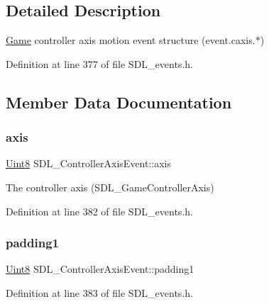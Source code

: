 \subsection{Detailed Description}
\mbox{\hyperlink{class_game}{Game}} controller axis motion event structure (event.\+caxis.$\ast$) 

Definition at line 377 of file S\+D\+L\+\_\+events.\+h.



\subsection{Member Data Documentation}
\mbox{\label{struct_s_d_l___controller_axis_event_aba6543c143521aebce06a41a8cf79db0}} 
\subsubsection{\texorpdfstring{axis}{axis}}
{\footnotesize\ttfamily \mbox{\hyperlink{_s_d_l__stdinc_8h_a2944638813a090aa23e62f4da842c3e2}{Uint8}} S\+D\+L\+\_\+\+Controller\+Axis\+Event\+::axis}

The controller axis (S\+D\+L\+\_\+\+Game\+Controller\+Axis) 

Definition at line 382 of file S\+D\+L\+\_\+events.\+h.

\mbox{\label{struct_s_d_l___controller_axis_event_af980495b1e24f9a868f2ccb25ce9629b}} 
\subsubsection{\texorpdfstring{padding1}{padding1}}
{\footnotesize\ttfamily \mbox{\hyperlink{_s_d_l__stdinc_8h_a2944638813a090aa23e62f4da842c3e2}{Uint8}} S\+D\+L\+\_\+\+Controller\+Axis\+Event\+::padding1}



Definition at line 383 of file S\+D\+L\+\_\+events.\+h.

\mbox{\label{struct_s_d_l___controller_axis_event_a4a04fcd20a54db21c5258ab0e40c6ab5}} 
